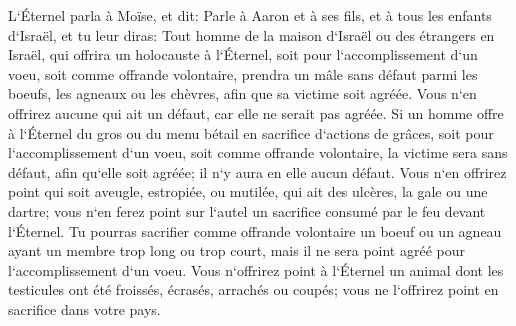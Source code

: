 \verse L`Éternel parla à Moïse, et dit: 
\verse Parle à Aaron et à ses fils, et à tous les enfants d`Israël, et tu leur diras: Tout homme de la maison d`Israël ou des étrangers en Israël, qui offrira un holocauste à l`Éternel, soit pour l`accomplissement d`un voeu, soit comme offrande volontaire, 
\verse prendra un mâle sans défaut parmi les boeufs, les agneaux ou les chèvres, afin que sa victime soit agréée. 
\verse Vous n`en offrirez aucune qui ait un défaut, car elle ne serait pas agréée. 
\verse Si un homme offre à l`Éternel du gros ou du menu bétail en sacrifice d`actions de grâces, soit pour l`accomplissement d`un voeu, soit comme offrande volontaire, la victime sera sans défaut, afin qu`elle soit agréée; il n`y aura en elle aucun défaut. 
\verse Vous n`en offrirez point qui soit aveugle, estropiée, ou mutilée, qui ait des ulcères, la gale ou une dartre; vous n`en ferez point sur l`autel un sacrifice consumé par le feu devant l`Éternel. 
\verse Tu pourras sacrifier comme offrande volontaire un boeuf ou un agneau ayant un membre trop long ou trop court, mais il ne sera point agréé pour l`accomplissement d`un voeu. 
\verse Vous n`offrirez point à l`Éternel un animal dont les testicules ont été froissés, écrasés, arrachés ou coupés; vous ne l`offrirez point en sacrifice dans votre pays. 
